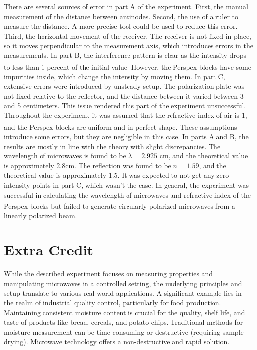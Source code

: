 \documentclass[10pt]{article}
\begin{document}
There are several sources of error in part A of the experiment. First, the manual measurement of the distance between antinodes. Second, the use of a ruler to measure the distance. A more precise tool could be used to reduce this error. Third, the horizontal movement of the receiver. The receiver is not fixed in place, so it moves perpendicular to the measurement axis, which introduces errors in the measurements. In part B, the interference pattern is clear as the intensity drops to less than 1 percent of the initial value. However, the Perspex\textsuperscript{\textregistered} blocks have some impurities inside, which change the intensity by moving them. In part C, extensive errors were introduced by unsteady setup. The polarization plate was not fixed relative to the reflector, and the distance between it varied between 3 and 5 centimeters. This issue rendered this part of the experiment unsuccessful. Throughout the experiment, it was assumed that the refractive index of air is 1, and the Perspex\textsuperscript{\textregistered} blocks are uniform and in perfect shape. These assumptions introduce some errors, but they are negligible in this case. In parts A and B, the results are mostly in line with the theory with slight discrepancies. The wavelength of microwaves is found to be $\lambda = 2.925$ cm, and the theoretical value is approximately 2.8cm. The reflection was found to be $n = 1.59$, and the theoretical value is approximately 1.5. It was expected to not get any zero intensity points in part C, which wasn't the case. In general, the experiment was successful in calculating the wavelength of microwaves and refractive index of the Perspex\textsuperscript{\textregistered} blocks but failed to generate circularly polarized microwaves from a linearly polarized beam.

\section{Extra Credit}

While the described experiment focuses on measuring properties and manipulating microwaves in a controlled setting, the underlying principles and setup translate to various real-world applications. A significant example lies in the realm of industrial quality control, particularly for food production. Maintaining consistent moisture content is crucial for the quality, shelf life, and taste of products like bread, cereals, and potato chips. Traditional methods for moisture measurement can be time-consuming or destructive (requiring sample drying). Microwave technology offers a non-destructive and rapid solution.
\end{document}
